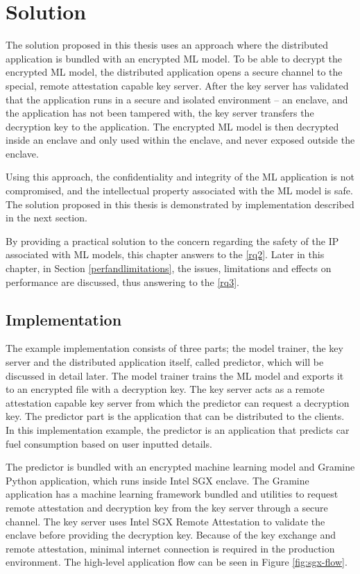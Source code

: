 \chapter{Solution} \label{solution}

The solution proposed in this thesis uses an approach where the distributed application is bundled with an encrypted ML model. To be able to decrypt the encrypted ML model, the distributed application opens a secure channel to the special, remote attestation capable key server. After the key server has validated that the application runs in a secure and isolated environment -- an enclave, and the application has not been tampered with, the key server transfers the decryption key to the application. The encrypted ML model is then decrypted inside an enclave and only used within the enclave, and never exposed outside the enclave.

Using this approach, the confidentiality and integrity of the ML application is not compromised, and the intellectual property associated with the ML model is safe. The solution proposed in this thesis is demonstrated by implementation described in the next section.

By providing a practical solution to the concern regarding the safety of the IP associated with ML models, this chapter answers to the \ref{rq2}. Later in this chapter, in Section \ref{perfandlimitations}, the issues, limitations and effects on performance are discussed, thus answering to the \ref{rq3}.

\section{Implementation} \label{implementation}

The example implementation consists of three parts; the model trainer, the key server and the distributed application itself, called predictor, which will be discussed in detail later. The model trainer trains the ML model and exports it to an encrypted file with a decryption key. The key server acts as a remote attestation capable key server from which the predictor can request a decryption key. The predictor part is the application that can be distributed to the clients. In this implementation example, the predictor is an application that predicts car fuel consumption based on user inputted details.

The predictor is bundled with an encrypted machine learning model and Gramine Python application, which runs inside Intel SGX enclave. The Gramine application has a machine learning framework bundled and utilities to request remote attestation and decryption key from the key server through a secure channel. The key server uses Intel SGX Remote Attestation to validate the enclave before providing the decryption key. Because of the key exchange and remote attestation, minimal internet connection is required in the production environment. The high-level application flow can be seen in Figure \ref{fig:sgx-flow}.

